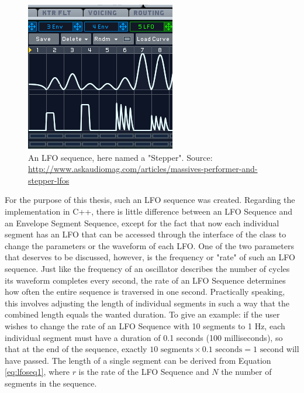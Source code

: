 \documentclass[12pt,twoside]{report}
\begin{document}

\begin{figure}
  \includegraphics[scale=0.6]{img/lfoseq}
  \caption{An LFO sequence, here named a "Stepper". Source: \protect\url{http://www.askaudiomag.com/articles/massives-performer-and-stepper-lfos}}
  \label{fig:lfoseq}
\end{figure}

\noindent For the purpose of this thesis, such an LFO sequence was created. Regarding the implementation in C++, there is little difference between an LFO Sequence and an Envelope Segment Sequence, except for the fact that now each individual segment has an LFO that can be accessed through the interface of the class to change the parameters or the waveform of each LFO. One of the two parameters that deserves to be discussed, however, is the frequency or "rate" of such an LFO sequence. Just like the frequency of an oscillator describes the number of cycles its waveform completes every second, the rate of an LFO Sequence determines how often the entire sequence is traversed in one second. Practically speaking, this involves adjusting the length of individual segments in such a way that the combined length equals the wanted duration. To give an example: if the user wishes to change the rate of an LFO Sequence with 10 segments to 1 Hz, each individual segment must have a duration of 0.1 seconds (100 milliseconds), so that at the end of the sequence, exactly $10 \text{ segments} \times 0.1 \text{ seconds} = 1 \text{ second}$ will have passed. The length of a single segment can be derived from Equation \ref{eq:lfoseq1}, where $r$ is the rate of the LFO Sequence and $N$ the number of segments in the sequence.
\end{document}
